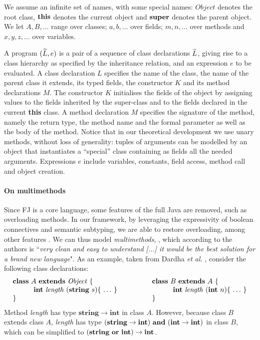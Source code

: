 We assume an infinite set of names, with some special names:
$\mathit{Object}$ denotes the root class, $\mathbf{this}$ denotes the current object and $\mathbf{super}$ denotes the parent object.
We let  $A, B,\ldots$ range over classes; $a, b,\ldots$ over fields; $m, n,\ldots$ over methods and $x, y, z, \ldots$ over variables.

A {program} $(\widetilde{L}, e)$ is a pair of a sequence of class declarations $\widetilde{L}$, giving rise to a class hierarchy as specified by the inheritance relation, and an expression $e$ to be evaluated.
%
A class declaration $L$ specifies the name of the class, the name of the parent class it extends, its typed fields, the constructor $K$ and its method declarations $M$.
The constructor $K$ initialises the fields of the object by assigning values to the fields inherited by the super-class and to the fields declared in the current \textbf{this} class.
%
A method declaration $M$ specifies the signature of the method, namely the return type, the method name and the formal parameter as well as the body of the method.
Notice that in our theoretical development we use unary methods, without loss of generality: tuples of arguments can be modelled by an object that instantiates a ``special'' class containing as fields all the needed arguments.
Expressions $e$ include variables, constants, field access, method call and object creation.


\paragraph{On multimethods}
Since FJ is a core language, some features of the full Java are removed, such as overloading methods.
In our framework, by leveraging the expressivity of boolean connectives and semantic subtyping, we are able to restore overloading, among other features \cite[\S 8.4]{Dardha2017}.
We can thus model \emph{multimethods}, \cite{BC97}, which according to the authors is ``\emph{very clean and easy to understand [...] it would be the best solution for a brand new language}".
As an example, taken from Dardha \emph{et al.}  \cite{Dardha2013,Dardha2017}, consider the following class declarations:
$$
\begin{array}{ll}
\mathbf{class} \  A \ \mathbf{extends }\  \mathit{Object}\ \{
&
\qquad
\mathbf{class} \  B \ \mathbf{extends }\  A\ \{
\\
	\qquad\quad \mathbf{int}\ \mathit{length}\ (\mathbf{string}\ s)\{\ \ldots\ \}\qquad
&
	\qquad\qquad\quad \mathbf{int}\ \mathit{length}\ (\mathbf{int}\ n)\{\ \ldots\ \}
\\
\}
&
\qquad \}
\end{array}
$$
Method {\it length} has type $\mathbf{string} \rightarrow \mathbf{int}$ in class $A$.
However, because class $B$ extends class $A$,  {\it length} has type $(\mathbf{string} \rightarrow \mathbf{int})\ \mathbf{and}\ (\mathbf{int} \rightarrow \mathbf{int})$ in class $B$,
which can be simplified to $(\mathbf{string}\ \mathbf{or}\ \mathbf{int}) \rightarrow \mathbf{int}$.

